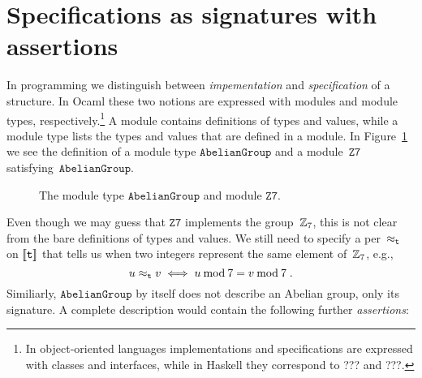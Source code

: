 \section{Specifications as signatures with assertions}
\label{sec:spec-sign-assert}


In programming we distinguish between \emph{impementation} and
\emph{specification} of a structure. In Ocaml these two notions are
expressed with modules and module types, respectively.\footnote{In
  object-oriented languages implementations and specifications are
  expressed with classes and interfaces, while in Haskell they
  correspond to ??? and ???.} A module contains definitions of types
and values, while a module type lists the types and values that are
defined in a module. In Figure~\ref{fig:module-example} we see the
definition of a module type $\mathtt{AbelianGroup}$ and a
module~$\mathtt{Z7}$ satisfying~$\mathtt{AbelianGroup}$.
%
\begin{figure}
  \centering
  \caption{The module type $\mathtt{AbelianGroup}$ and module
    $\mathtt{Z7}$.}
  \label{fig:module-example}
\end{figure}
%
Even though we may guess that $\mathtt{Z7}$ implements the
group~$\mathbb{Z}_7$, this is not clear from the bare definitions of types
and values. We still need to specify a per~$\approx_{\mathtt{t}}$ on
$[\![\mathtt{t}]\!]$ that tells us when two integers represent the
same element of~$\mathbb{Z}_7$, e.g.,
%
\begin{equation*}
  u \approx_{\mathtt{t}} v \iff
  u \mathbin{\mathrm{mod}} 7 = v \mathbin{\mathrm{mod}} 7 \;.
\end{equation*}
%
Similiarly, $\mathtt{AbelianGroup}$ by itself does not describe an
Abelian group, only its signature. A complete description would
contain the following further \emph{assertions}:
%
